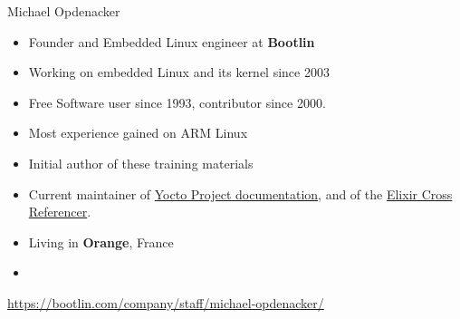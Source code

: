 \begin{frame}{Michael Opdenacker}
    \begin{itemize}
        \item Founder and Embedded Linux engineer at {\bf Bootlin}
        \item Working on embedded Linux and its kernel since 2003
        \item Free Software user since 1993, contributor since 2000.
        \item Most experience gained on ARM Linux
        \item Initial author of these training materials
        \item Current maintainer of
              \href{https://docs.yoctoproject.org/}{Yocto Project documentation},
              and of the \href{https://github.com/bootlin/elixir}{Elixir Cross Referencer}.
        \item Living in {\bf Orange}, France
        \item {}
    \end{itemize}
    {\small \url{https://bootlin.com/company/staff/michael-opdenacker/}}
\end{frame}
